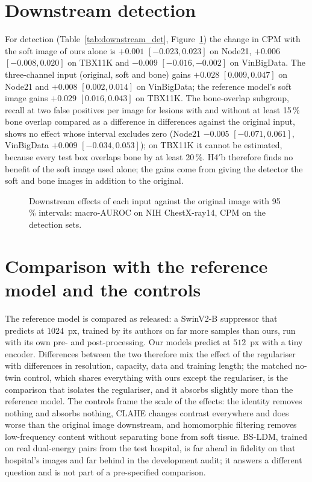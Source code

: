 \section{Downstream detection}
For detection (Table~\ref{tab:downstream_det}, Figure~\ref{fig:downstream_forest}) the change in CPM with the soft image of ours alone is
$+0.001$ $[-0.023,0.023]$ on Node21, $+0.006$ $[-0.008,0.020]$ on TBX11K and $-0.009$ $[-0.016,-0.002]$ on VinBigData. The three-channel input
(original, soft and bone) gains $+0.028$ $[0.009,0.047]$ on Node21 and $+0.008$ $[0.002,0.014]$ on VinBigData; the reference model's soft image
gains $+0.029$ $[0.016,0.043]$ on TBX11K. The bone-overlap subgroup, recall at two false positives per image for lesions with and without at
least 15\,\% bone overlap compared as a difference in differences against the original input, shows no effect whose interval excludes zero
(Node21 $-0.005$ $[-0.071,0.061]$, VinBigData $+0.009$ $[-0.034,0.053]$); on TBX11K it cannot be estimated, because every test box overlaps bone
by at least 20\,\%. H4$'$b therefore finds no benefit of the soft image used alone; the gains come from giving the detector the soft and bone
images in addition to the original.
\begin{table}[htbp]
\centering\small
\caption{Downstream detection on Node21, TBX11K and VinBigData: CPM and mAP@50 (mean $\pm$ SD over three seeds), differences to the original
image and the difference in differences (DiD) of recall at two false positives per image (image bootstrap).}
\label{tab:downstream_det}
\end{table}
\begin{figure}[htbp]
\centering
{}
\caption{Downstream effects of each input against the original image with 95\,\% intervals: macro-AUROC on NIH ChestX-ray14, CPM on the
detection sets.}
\label{fig:downstream_forest}
\end{figure}

\section{Comparison with the reference model and the controls}
The reference model is compared as released: a SwinV2-B suppressor that predicts at $1024$~px, trained by its authors on far more samples than
ours, run with its own pre- and post-processing. Our models predict at $512$~px with a tiny encoder. Differences between the two therefore mix
the effect of the regulariser with differences in resolution, capacity, data and training length; the matched no-twin control, which shares
everything with ours except the regulariser, is the comparison that isolates the regulariser, and it absorbs slightly more than the reference
model. The controls frame the scale of the effects: the identity removes nothing and absorbs nothing, CLAHE changes contrast everywhere and
does worse than the original image downstream, and homomorphic filtering removes low-frequency content without separating bone from soft
tissue. BS-LDM, trained on real dual-energy pairs from the test hospital, is far ahead in fidelity on that hospital's images and far behind
in the development audit; it answers a different question and is not part of a pre-specified comparison.
